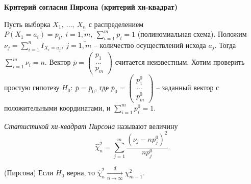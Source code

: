 \textbf{Критерий согласия Пирсона (критерий хи-квадрат)}

Пусть выборка $\displaystyle X_{1} ,\ \dotsc ,\ X_{n}$ с распределением $\displaystyle P( X_{1} =a_{i}) =p_{i} ,\ i=\overline{1,m} ,\ \sum _{i=1}^{m} p_{i} =1$ (полиномиальная схема). Положим $\displaystyle \nu _{j} =\sum _{i=1}^{n} I_{X_{i} =a_{j}} ,\ j=\overline{1,m}$ -- количество осуществлений исхода $\displaystyle a_{j}$. Тогда $\displaystyle \sum _{i=1}^{m} \nu _{i} =n$. Вектор $\displaystyle \overline{p} =\begin{pmatrix}
p_{1}\\
\dotsc \\
p_{m}
\end{pmatrix}$ считается неизвестным. Хотим проверить простую гипотезу $\displaystyle H_{0} :\ \overline{p} =\overline{p}_{0}$, где $\displaystyle \overline{p}_{0} =\begin{pmatrix}
p_{1}^{0}\\
\dotsc \\
p_{m}^{0}
\end{pmatrix}$ -- заданный вектор с положительными координатами, и $\displaystyle \sum _{i=1}^{m} p_{i}^{0} =1$.
\begin{definition}
    \textit{Статистикой хи-квадрат Пирсона} называют величину
    \begin{equation*}
        \hat{\chi }_{n}^{2} =\sum _{j=1}^{m}\dfrac{\left( \nu _{j} -np_{j}^{0}\right)^{2}}{np_{j}^{0}} .
    \end{equation*}
\end{definition}
\begin{theorem}
    (Пирсона) Если $\displaystyle H_{0}$ верна, то $\displaystyle \hat{\chi }_{n}^{2}\xrightarrow[n\rightarrow \infty ]{d} \chi _{m-1}^{2}$.
\end{theorem}

